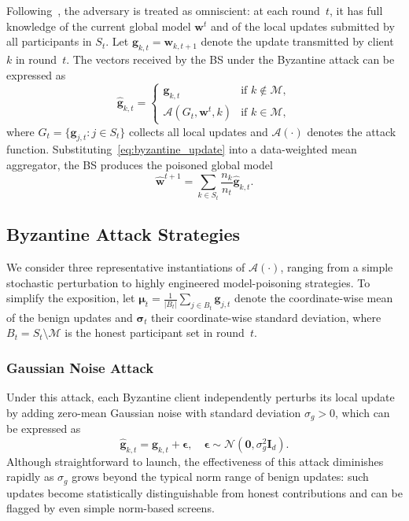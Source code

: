 \documentclass[journal]{IEEEtran}
\begin{document}
Following~\cite{shejwalkar2021manipulating, baruch2019little}, the adversary is treated as omniscient: at each round~$t$, it has full knowledge of the current global model $\mathbf{w}^t$ and of the local updates submitted by all participants in $S_t$. Let $\mathbf{g}_{k,t} = \mathbf{w}_{k,t+1}$ denote the update transmitted by client~$k$ in round~$t$. The vectors received by the BS under the Byzantine attack can be expressed as
\begin{equation}
\hat{\mathbf{g}}_{k,t} =
\begin{cases}
\mathbf{g}_{k,t} & \text{if } k \notin \mathcal{M}, \\
\mathcal{A}(G_t, \mathbf{w}^t, k) & \text{if } k \in \mathcal{M},
\end{cases}
\label{eq:byzantine_update}
\end{equation}
where $G_t = \{\mathbf{g}_{j,t} : j \in S_t\}$ collects all local updates and $\mathcal{A}(\cdot)$ denotes the attack function. Substituting~\eqref{eq:byzantine_update} into a data-weighted mean aggregator, the BS produces the poisoned global model
\begin{equation}
\hat{\mathbf{w}}^{t+1} = \sum_{k \in S_t} \frac{n_k}{n_t} \hat{\mathbf{g}}_{k,t}.
\label{eq:poisoned_agg}
\end{equation}

\subsection{Byzantine Attack Strategies}

We consider three representative instantiations of $\mathcal{A}(\cdot)$, ranging from a simple stochastic perturbation to highly engineered model-poisoning strategies. To simplify the exposition, let $\boldsymbol{\mu}_t = \frac{1}{|B_t|} \sum_{j \in B_t} \mathbf{g}_{j,t}$ denote the coordinate-wise mean of the benign updates and $\boldsymbol{\sigma}_t$ their coordinate-wise standard deviation, where $B_t = S_t \setminus \mathcal{M}$ is the honest participant set in round~$t$.

\subsubsection{Gaussian Noise Attack}
Under this attack, each Byzantine client independently perturbs its local update by adding zero-mean Gaussian noise with standard deviation $\sigma_g > 0$, which can be expressed as
\begin{equation}
\hat{\mathbf{g}}_{k,t} = \mathbf{g}_{k,t} + \boldsymbol{\epsilon}, \quad \boldsymbol{\epsilon} \sim \mathcal{N}(\mathbf{0}, \sigma_g^2 \mathbf{I}_d).
\label{eq:gaussian_attack}
\end{equation}
Although straightforward to launch, the effectiveness of this attack diminishes rapidly as $\sigma_g$ grows beyond the typical norm range of benign updates: such updates become statistically distinguishable from honest contributions and can be flagged by even simple norm-based screens.
\end{document}
